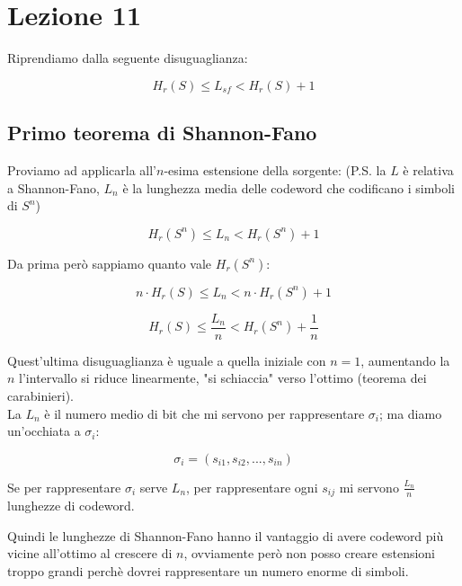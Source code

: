 \section*{Lezione 11}

Riprendiamo dalla seguente disuguaglianza:

\begin{equation*}
H_r(S) \leq L_{sf} < H_r(S) + 1
\end{equation*}

\subsection*{Primo teorema di Shannon-Fano}

Proviamo ad applicarla all'$n$-esima estensione della sorgente:
(P.S. la $L$ è relativa a Shannon-Fano, $L_n$ è la lunghezza media delle codeword che codificano i simboli di $S^n$)

\begin{equation*}
H_r(S^n) \leq L_{n} < H_r(S^n) + 1
\end{equation*}

Da prima però sappiamo quanto vale $H_r(S^n)$:

\begin{equation*}
n \cdot H_r(S) \leq L_{n} < n \cdot H_r(S^n) + 1
\end{equation*}

\begin{equation*}
H_r(S) \leq \frac{L_{n}}{n} < H_r(S^n) + \frac{1}{n}
\end{equation*}

Quest'ultima disuguaglianza è uguale a quella iniziale con $n=1$, aumentando la $n$ l'intervallo si riduce linearmente, "si schiaccia" verso l'ottimo (teorema dei carabinieri).\\

La $L_n$ è il numero medio di bit che mi servono per rappresentare $\sigma_i$; ma diamo un'occhiata a $\sigma_i$:

\begin{equation*}
\sigma_i= (s_{i1}, s_{i2}, ... , s_{in})
\end{equation*}

Se per rappresentare $\sigma_i$ serve $L_n$, per rappresentare ogni $s_{ij}$ mi servono $\frac{L_n}{n}$ lunghezze di codeword.

Quindi le lunghezze di Shannon-Fano hanno il vantaggio di avere codeword più vicine all'ottimo al crescere di $n$, ovviamente però non posso creare estensioni troppo grandi perchè dovrei rappresentare un numero enorme di simboli.

